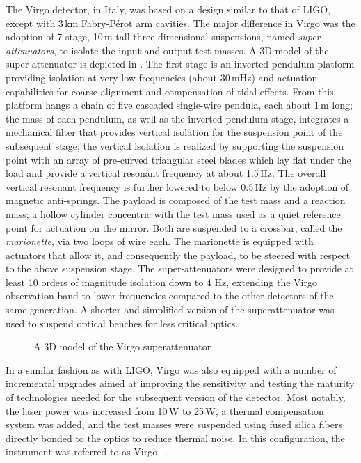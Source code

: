 The Virgo detector\cite{Accadia_2012}, in Italy, was based on a design similar to that of LIGO, except with 3\,km Fabry-P\'{e}rot arm cavities. 
The major difference in Virgo was the adoption of 7-stage, 10\,m tall three dimensional suspensions, named \textit{super-attenuators}, to isolate the input and output test masses.
A 3D model of the super-attenuator is depicted in . The first stage is an inverted pendulum platform providing isolation at very low frequencies (about 30\,mHz) and actuation capabilities for coarse alignment and compensation of tidal effects.
From this platform hangs a chain of five cascaded single-wire pendula, each about 1\,m long; the mass of each pendulum, as well as the inverted pendulum stage, integrates a mechanical filter that provides vertical isolation for the suspension point of the subsequent stage; the vertical isolation is realized by supporting the suspension point with an array of pre-curved triangular steel blades which lay flat under the load and provide a vertical resonant frequency at about 1.5\,Hz.
The overall vertical resonant frequency is further lowered to below 0.5\,Hz by the adoption of magnetic anti-springs.
The payload is composed of the test mass and a reaction mass; a hollow cylinder concentric with the test mass used as a quiet reference point for actuation on the mirror. Both are suspended to a crossbar, called the \textit{marionette}, via two loops of wire each.
The marionette is equipped with actuators that allow it, and consequently the payload, to be steered with respect to the above suspension stage. 
The super-attenuators were designed to provide at least 10 orders of magnitude isolation down to 4 Hz, extending the Virgo observation band to lower frequencies compared to the other detectors of the same generation.
A shorter and simplified version of the superattenuator was used to suspend optical benches for less critical optics.

\begin{figure}
	\caption{\label{fig:superattenuator}A 3D model of the Virgo superattenuator}
\end{figure}

In a similar fashion as with LIGO, Virgo was also equipped with a number of incremental upgrades aimed at improving the sensitivity and testing the maturity of technologies needed for the subsequent version of the detector.
Most notably, the laser power was increased from 10\,W to 25\,W, a thermal compensation system was added, and the test masses were suspended using fused silica fibers directly bonded to the optics to reduce thermal noise\cite{Lorenzini_2010}.
In this configuration, the instrument was referred to as Virgo+.

